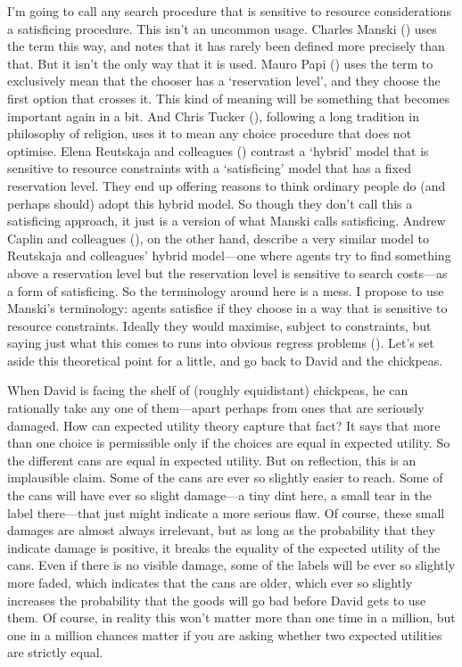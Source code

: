 \documentclass[
  10pt,
  letterpaper,
  twoside]{scrbook}
\begin{document}
I'm going to call any search procedure that is sensitive to resource
considerations a satisficing procedure. This isn't an uncommon usage.
Charles Manski () uses the term this way,
and notes that it has rarely been defined more precisely than that. But
it isn't the only way that it is used. Mauro Papi
() uses the term to exclusively mean that
the chooser has a `reservation level', and they choose the first option
that crosses it. This kind of meaning will be something that becomes
important again in a bit. And Chris Tucker
(), following a long tradition in
philosophy of religion, uses it to mean any choice procedure that does
not optimise. Elena Reutskaja and colleagues
() contrast a `hybrid' model that is
sensitive to resource constraints with a `satisficing' model that has a
fixed reservation level. They end up offering reasons to think ordinary
people do (and perhaps should) adopt this hybrid model. So though they
don't call this a satisficing approach, it just is a version of what
Manski calls satisficing. Andrew Caplin and colleagues
(), on the other hand, describe a very
similar model to Reutskaja and colleagues' hybrid model---one where
agents try to find something above a reservation level but the
reservation level is sensitive to search costs---as a form of
satisficing. So the terminology around here is a mess. I propose to use
Manski's terminology: agents satisfice if they choose in a way that is
sensitive to resource constraints. Ideally they would maximise, subject
to constraints, but saying just what this comes to runs into obvious
regress problems (). Let's set
aside this theoretical point for a little, and go back to David and the
chickpeas.

When David is facing the shelf of (roughly equidistant) chickpeas, he
can rationally take any one of them---apart perhaps from ones that are
seriously damaged. How can expected utility theory capture that fact? It
says that more than one choice is permissible only if the choices are
equal in expected utility. So the different cans are equal in expected
utility. But on reflection, this is an implausible claim. Some of the
cans are ever so slightly easier to reach. Some of the cans will have
ever so slight damage---a tiny dint here, a small tear in the label
there---that just might indicate a more serious flaw. Of course, these
small damages are almost always irrelevant, but as long as the
probability that they indicate damage is positive, it breaks the
equality of the expected utility of the cans. Even if there is no
visible damage, some of the labels will be ever so slightly more faded,
which indicates that the cans are older, which ever so slightly
increases the probability that the goods will go bad before David gets
to use them. Of course, in reality this won't matter more than one time
in a million, but one in a million chances matter if you are asking
whether two expected utilities are strictly equal.
\end{document}
